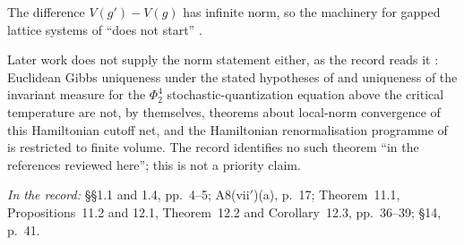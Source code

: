 \begin{context}
The difference $V(g')-V(g)$ has infinite norm, so the machinery for gapped lattice
systems of \cite{Hastings,BMNS} ``does not start'' .
\end{context}

Later work does not supply the norm statement either, as the record reads it
: Euclidean Gibbs uniqueness under the stated hypotheses of \cite{AHZ} and
uniqueness of the invariant measure for the $\Phi^4_2$ stochastic-quantization equation
above the critical temperature \cite{BDW} are not, by themselves, theorems about local-norm
convergence of this Hamiltonian cutoff net, and the Hamiltonian renormalisation programme
of \cite{RZT} is restricted to finite volume. The record identifies no such theorem ``in
the references reviewed here''; this is not a priority claim.

\noindent\emph{In the record:} \S\S1.1 and 1.4, pp.~4--5; A8(vii$'$)(a), p.~17;
Theorem~11.1, Propositions~11.2 and 12.1, Theorem~12.2 and Corollary~12.3, pp.~36--39;
\S14, p.~41.
